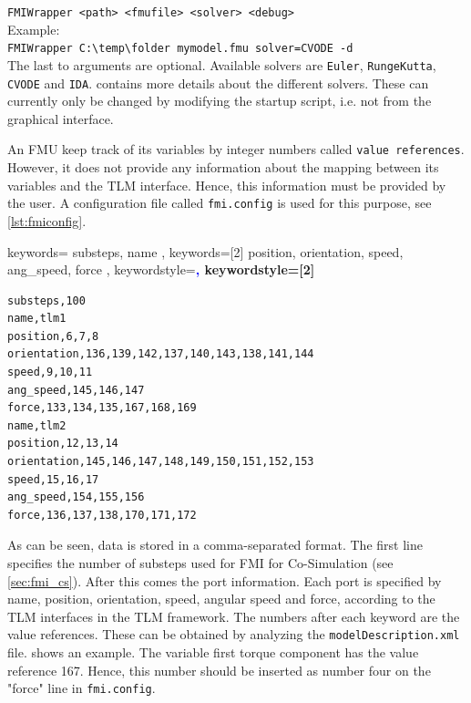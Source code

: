 \documentclass[11pt,a4paper,english]{report}
\begin{document}
\noindent \verb|FMIWrapper <path> <fmufile> <solver> <debug>|\\

Example:\\

\noindent \verb|FMIWrapper C:\temp\folder mymodel.fmu solver=CVODE -d|\\

The last to arguments are optional.
Available solvers are \texttt{Euler}, \texttt{RungeKutta}, \texttt{CVODE} and \texttt{IDA}.
 contains more details about the different solvers.
These can currently only be changed by modifying the startup script, i.e. not from the graphical interface.

An FMU keep track of its variables by integer numbers called \texttt{value references}.
However, it does not provide any information about the mapping between its variables and the TLM interface.
Hence, this information must be provided by the user.
A configuration file called \texttt{fmi.config} is used for this purpose, see \cref{lst:fmiconfig}.

{
  keywords={
    substeps,
    name
  },
  keywords=[2]{
    position,
    orientation,
    speed,
    ang_speed,
    force
  },
  keywordstyle=\ttfamily\bfseries\textcolor{blue},
  keywordstyle=[2]\ttfamily\bfseries
}

\begin{lstlisting}[language=fmiconfig,basicstyle=\ttfamily,floatplacement=ht,caption=A configuration file maps value references to TLM variables,label=lst:fmiconfig]
substeps,100
name,tlm1
position,6,7,8
orientation,136,139,142,137,140,143,138,141,144
speed,9,10,11
ang_speed,145,146,147
force,133,134,135,167,168,169
name,tlm2
position,12,13,14
orientation,145,146,147,148,149,150,151,152,153
speed,15,16,17
ang_speed,154,155,156
force,136,137,138,170,171,172
\end{lstlisting}
\newpage
As can be seen, data is stored in a comma-separated format.
The first line specifies the number of substeps used for FMI for Co-Simulation (see \cref{sec:fmi_cs}).
After this comes the port information.
Each port is specified by name, position, orientation, speed, angular speed and force, according to the TLM interfaces in the TLM framework.
The numbers after each keyword are the value references.
These can be obtained by analyzing the \texttt{modelDescription.xml} file.
 shows an example.
The variable first torque component has the value reference 167.
Hence, this number should be inserted as number four on the "force" line in \texttt{fmi.config}.
\end{document}
